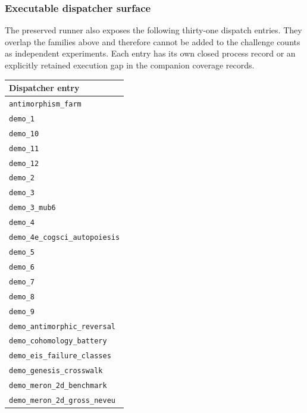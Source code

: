 \documentclass[
  11pt,
]{article}
\begin{document}
\subsubsection{Executable dispatcher
surface}\label{executable-dispatcher-surface}

The preserved runner also exposes the following thirty-one dispatch
entries. They overlap the families above and therefore cannot be added
to the challenge counts as independent experiments. Each entry has its
own closed process record or an explicitly retained execution gap in the
companion coverage records.

\begin{longtable}[]{@{}l@{}}
\toprule\noalign{}
Dispatcher entry \\
\midrule\noalign{}
\endhead
\bottomrule\noalign{}
\endlastfoot
\texttt{antimorphism\_\allowbreak{}farm} \\
\texttt{demo\_\allowbreak{}1} \\
\texttt{demo\_\allowbreak{}10} \\
\texttt{demo\_\allowbreak{}11} \\
\texttt{demo\_\allowbreak{}12} \\
\texttt{demo\_\allowbreak{}2} \\
\texttt{demo\_\allowbreak{}3} \\
\texttt{demo\_\allowbreak{}3\_\allowbreak{}mub6} \\
\texttt{demo\_\allowbreak{}4} \\
\texttt{demo\_\allowbreak{}4e\_\allowbreak{}cogsci\_\allowbreak{}autopoiesis} \\
\texttt{demo\_\allowbreak{}5} \\
\texttt{demo\_\allowbreak{}6} \\
\texttt{demo\_\allowbreak{}7} \\
\texttt{demo\_\allowbreak{}8} \\
\texttt{demo\_\allowbreak{}9} \\
\texttt{demo\_\allowbreak{}antimorphic\_\allowbreak{}reversal} \\
\texttt{demo\_\allowbreak{}cohomology\_\allowbreak{}battery} \\
\texttt{demo\_\allowbreak{}eis\_\allowbreak{}failure\_\allowbreak{}classes} \\
\texttt{demo\_\allowbreak{}genesis\_\allowbreak{}crosswalk} \\
\texttt{demo\_\allowbreak{}meron\_\allowbreak{}2d\_\allowbreak{}benchmark} \\
\texttt{demo\_\allowbreak{}meron\_\allowbreak{}2d\_\allowbreak{}gross\_\allowbreak{}neveu} \\

\end{longtable}
\end{document}
